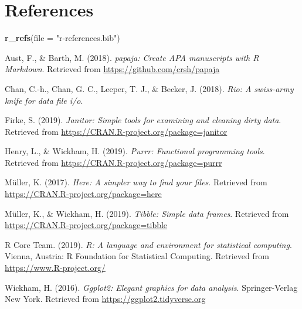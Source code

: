 \documentclass[man]{apa6}
\newenvironment{Shaded}{\begin{snugshade}}{\end{snugshade}}
\newcommand{\DataTypeTok}[1]{\textcolor[rgb]{0.13,0.29,0.53}{#1}}
\newcommand{\KeywordTok}[1]{\textcolor[rgb]{0.13,0.29,0.53}{\textbf{#1}}}
\newcommand{\NormalTok}[1]{#1}
\newcommand{\StringTok}[1]{\textcolor[rgb]{0.31,0.60,0.02}{#1}}
\begin{document}
\newpage

\hypertarget{references}{%
\section{References}\label{references}}

\begin{Shaded}
\begin{Highlighting}[]
\KeywordTok{r_refs}\NormalTok{(}\DataTypeTok{file =} \StringTok{"r-references.bib"}\NormalTok{)}
\end{Highlighting}
\end{Shaded}

\begingroup
\setlength{\parindent}{-0.5in}
\setlength{\leftskip}{0.5in}

\hypertarget{refs}{}
\leavevmode\hypertarget{ref-R-papaja}{}%
Aust, F., \& Barth, M. (2018). \emph{papaja: Create APA manuscripts with R Markdown}. Retrieved from \url{https://github.com/crsh/papaja}

\leavevmode\hypertarget{ref-R-rio}{}%
Chan, C.-h., Chan, G. C., Leeper, T. J., \& Becker, J. (2018). \emph{Rio: A swiss-army knife for data file i/o}.

\leavevmode\hypertarget{ref-R-janitor}{}%
Firke, S. (2019). \emph{Janitor: Simple tools for examining and cleaning dirty data}. Retrieved from \url{https://CRAN.R-project.org/package=janitor}

\leavevmode\hypertarget{ref-R-purrr}{}%
Henry, L., \& Wickham, H. (2019). \emph{Purrr: Functional programming tools}. Retrieved from \url{https://CRAN.R-project.org/package=purrr}

\leavevmode\hypertarget{ref-R-here}{}%
Müller, K. (2017). \emph{Here: A simpler way to find your files}. Retrieved from \url{https://CRAN.R-project.org/package=here}

\leavevmode\hypertarget{ref-R-tibble}{}%
Müller, K., \& Wickham, H. (2019). \emph{Tibble: Simple data frames}. Retrieved from \url{https://CRAN.R-project.org/package=tibble}

\leavevmode\hypertarget{ref-R-base}{}%
R Core Team. (2019). \emph{R: A language and environment for statistical computing}. Vienna, Austria: R Foundation for Statistical Computing. Retrieved from \url{https://www.R-project.org/}

\leavevmode\hypertarget{ref-R-ggplot2}{}%
Wickham, H. (2016). \emph{Ggplot2: Elegant graphics for data analysis}. Springer-Verlag New York. Retrieved from \url{https://ggplot2.tidyverse.org}
\end{document}

